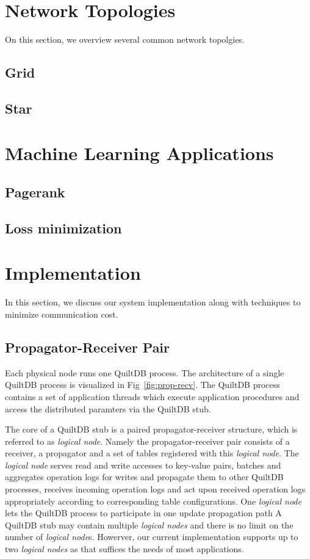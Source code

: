 \documentclass{acm_proc_article-sp}
\begin{document}
\section{Network Topologies}

On this section, we overview several common network topolgies.
\subsection{Grid}
\subsection{Star}

\section{Machine Learning Applications}

\subsection{Pagerank}
\subsection{Loss minimization}

\section{Implementation}
In this section, we discuss our system implementation along with techniques to 
minimize communication cost.

\subsection{Propagator-Receiver Pair}

Each physical node runs one QuiltDB process. The architecture of a single 
QuiltDB process is visualized in Fig~\ref{fig:prop-recv}.  The QuiltDB process
contains a set of application threads which execute application procedures and 
access the distributed paramters via the QuiltDB stub. 

The core of a QuiltDB stub is a paired propagator-receiver structure, which is 
referred to as \emph{logical node}. Namely the propagator-receiver pair consists
of a receiver, a propagator and a set of tables registered with this 
\emph{logical node}. The \emph{logical node} serves read and write accesses to 
key-value pairs, batches and aggregates operation logs for writes and propagate 
them to other QuiltDB processes, receives incoming operation logs and act upon 
received operation logs appropriately according to corresponding table 
configurations. One \emph{logical node} lets the QuiltDB process to participate 
in one update propagation path
A QuiltDB stub may contain multiple \emph{logical nodes} and 
there is no limit on the number of \emph{logical node}s. Howerver, our current 
implementation supports up to two \emph{logical nodes} as that suffices the 
needs of most applications.
\end{document}
